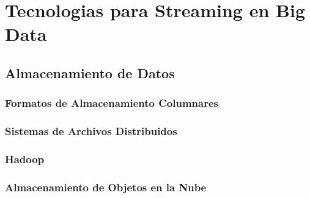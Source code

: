 \section{Tecnologias para Streaming en Big Data}





\subsection{Almacenamiento de Datos}
\subsubsection{Formatos de Almacenamiento Columnares}
\subsubsection{Sistemas de Archivos Distribuidos}
\subsubsection{Hadoop}
\subsubsection{Almacenamiento de Objetos en la Nube}